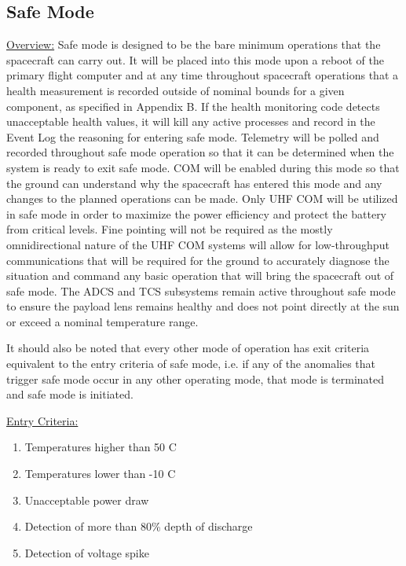 \documentclass{article}
\begin{document}
\newpage

\subsection{Safe Mode}

\underline{Overview:} Safe mode is designed to be the bare minimum operations that the spacecraft can carry out. It will be placed into this mode upon a reboot of the primary flight computer and at any time throughout spacecraft operations that a health measurement is recorded outside of nominal bounds for a given component, as specified in Appendix B. If the health monitoring code detects unacceptable health values, it will kill any active processes and record in the Event Log the reasoning for entering safe mode. Telemetry will be polled and recorded throughout safe mode operation so that it can be determined when the system is ready to exit safe mode. COM will be enabled during this mode so that the ground can understand why the spacecraft has entered this mode and any changes to the planned operations can be made. Only UHF COM will be utilized in safe mode in order to maximize the power efficiency and protect the battery from critical levels. Fine pointing will not be required as the mostly omnidirectional nature of the UHF COM systems will allow for low-throughput communications that will be required for the ground to accurately diagnose the situation and command any basic operation that will bring the spacecraft out of safe mode. The ADCS and TCS subsystems remain active throughout safe mode to ensure the payload lens remains healthy and does not point directly at the sun or exceed a nominal temperature range.

It should also be noted that every other mode of operation has exit criteria equivalent to the entry criteria of safe mode, i.e. if any of the anomalies that trigger safe mode occur in any other operating mode, that mode is terminated and safe mode is initiated.

\underline{Entry Criteria:} 

\begin{enumerate}
\item Temperatures higher than 50 \degree C
\item Temperatures lower than -10 \degree C
\item Unacceptable power draw
\item Detection of more than 80\% depth of discharge
\item Detection of voltage spike
\end{enumerate}
\end{document}
